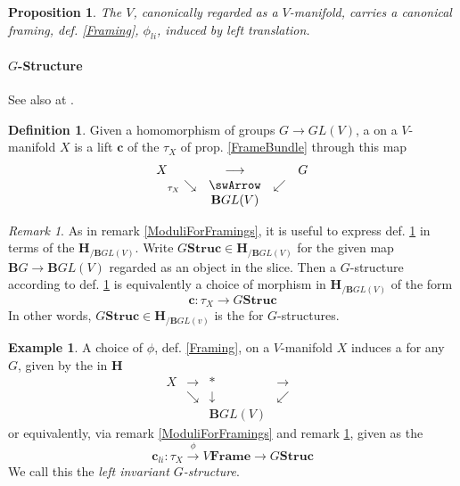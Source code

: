 \documentclass[12pt,titlepage]{article}
\def\mathllap{\mathpalette\mathllapinternal}
\def\mathllapinternal#1#2{\llap{$\mathsurround=0pt#1{#2}$}}
\newcommand{\itexarray}[1]{\begin{matrix}#1\end{matrix}}
\theoremstyle{plain}
\newtheorem{prop}{Proposition}
\theoremstyle{definition}
\newtheorem{defn}{Definition}
\newtheorem{example}{Example}
\theoremstyle{remark}
\newtheorem{remark}{Remark}
\begin{document}
\begin{prop}
\label{LeftTranslationFraming}\hypertarget{LeftTranslationFraming}{}
The  $V$, canonically regarded as a $V$-manifold, carries a canonical framing, def. \ref{Framing}, $\phi_{li}$, induced by left translation.
\end{prop}
\hypertarget{GStructure}{}\paragraph*{{$G$-Structure}}\label{GStructure}
See also at .
\begin{defn}
\label{GStructure}\hypertarget{GStructure}{}
Given a homomorphism of groups $G \longrightarrow GL(V)$, a  on a $V$-manifold $X$ is a lift $\mathbf{c}$ of the  $\tau_X$ of prop. \ref{FrameBundle} through this map
\begin{displaymath}
\itexarray{
X && \stackrel{}{\longrightarrow} && G
\\
& {}_{\mathllap{\tau_X}}\searrow &\swArrow& \swarrow
\\
&& \mathbf{B}GL(V)
}
\end{displaymath}
\end{defn}
\begin{remark}
\label{ModuliForGStructures}\hypertarget{ModuliForGStructures}{}
As in remark \ref{ModuliForFramings}, it is useful to express def. \ref{GStructure} in terms of the  $\mathbf{H}_{/\mathbf{B}GL(V)}$. Write $G\mathbf{Struc}\in \mathbf{H}_{/\mathbf{B}GL(V)}$ for the given map $\mathbf{B}G\to \mathbf{B}GL(V)$ regarded as an object in the slice. Then a $G$-structure according to def. \ref{GStructure} is equivalently a choice of morphism in $\mathbf{H}_{/\mathbf{B}GL(V)}$ of the form
\begin{displaymath}
\mathbf{c} \colon \tau_X \longrightarrow G\mathbf{Struc}
\end{displaymath}
In other words, $G\mathbf{Struc} \in \mathbf{H}_{/\mathbf{B}GL(v)}$ is the  for $G$-structures.
\end{remark}
\begin{example}
\label{GStructureFromLeftTranslationFraming}\hypertarget{GStructureFromLeftTranslationFraming}{}
A choice of  $\phi$, def. \ref{Framing}, on a $V$-manifold $X$ induces a  for any $G$, given by the  in $\mathbf{H}$
\begin{displaymath}
\itexarray{
X &\longrightarrow& \ast &\longrightarrow&
\\
& \searrow & \downarrow & \swarrow
\\
&& \mathbf{B}GL(V)
}
\end{displaymath}
or equivalently, via remark \ref{ModuliForFramings} and remark \ref{ModuliForGStructures}, given as the 
\begin{displaymath}
\mathbf{c}_{li}
\colon
\tau_X \stackrel{\phi}{\longrightarrow} V\mathbf{Frame} \longrightarrow G\mathbf{Struc}\end{displaymath}
We call this the \emph{left invariant $G$-structure}.
\end{example}
\end{document}
